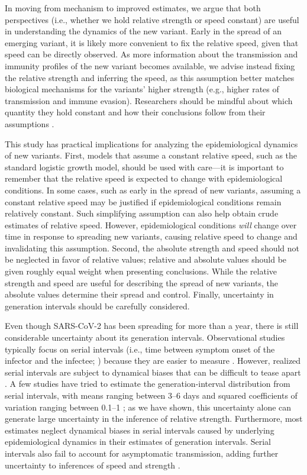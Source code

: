 \documentclass[12pt]{article}
\begin{document}
In moving from mechanism to improved estimates, we argue that both perspectives (i.e., whether we hold relative strength or speed constant) are useful in understanding the dynamics of the new variant.
Early in the spread of an emerging variant, it is likely more convenient to fix the relative speed, given that speed can be directly observed.
As more information about the transmission and immunity profiles of the new variant becomes available, we advise instead fixing the relative strength and inferring the speed, as this assumption better matches biological mechanisms for the variants' higher strength (e.g., higher rates of transmission and immune evasion).
Researchers should be mindful about which quantity they hold constant and how their conclusions follow from their assumptions \citep{doi:10.1098/rspb.2020.1556}.

This study has practical implications for analyzing the epidemiological dynamics of new variants.
First, models that assume a constant relative speed, such as the standard logistic growth model, should be used with care---it is important to remember that the relative speed is expected to change with epidemiological conditions.
In some cases, such as early in the spread of new variants, assuming a constant relative speed may be justified if epidemiological conditions remain relatively constant. 
Such simplifying assumption can also help obtain crude estimates of relative speed. 
However, epidemiological conditions \textit{will} change over time in response to spreading new variants, causing relative speed to change and invalidating this assumption.
Second, the absolute strength and speed should not be neglected in favor of relative values; relative and absolute values should be given roughly equal weight when presenting conclusions.
While the relative strength and speed are useful for describing the spread of new variants, the absolute values determine their spread and control.
Finally, uncertainty in generation intervals should be carefully considered.

Even though SARS-CoV-2 has been spreading for more than a year, there is still considerable uncertainty about its generation intervals.
Observational studies typically focus on serial intervals (i.e., time between symptom onset of the infector and the infectee; \cite{svensson2007note}) because they are easier to measure \citep{griffin2020rapid}.
However, realized serial intervals are subject to dynamical biases that can be difficult to tease apart \citep{park2021forward}.
A few studies have tried to estimate the generation-interval distribution from serial intervals, with means ranging between 3--6 days and squared coefficients of variation ranging between 0.1--1 \citep{ferretti2020quantifying,Ferretti2020timing,ganyani2020estimating,knight2020estimating}; 
as we have shown, this uncertainty alone can generate large uncertainty in the inference of relative strength.
Furthermore, most estimates neglect dynamical biases in serial intervals caused by underlying epidemiological dynamics in their estimates of generation intervals.
Serial intervals also fail to account for asymptomatic transmission, adding further uncertainty to inferences of speed and strength \citep{park2020time}.
\end{document}
